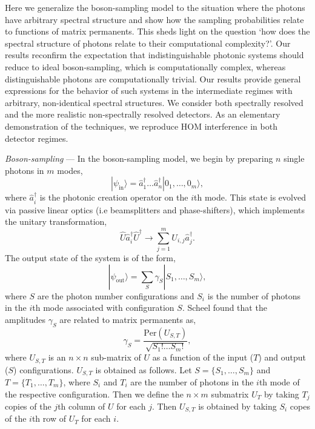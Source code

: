 \documentclass[aps,prl,twocolumn,amsmath,amssymb,nofootinbib,superscriptaddress]{revtex4}
\newcommand{\ket}[1]{|#1\rangle}
\begin{document}
Here we generalize the boson-sampling model to the situation where the photons have arbitrary spectral structure and show how the sampling probabilities relate to functions of matrix permanents. This sheds light on the question `how does the spectral structure of photons relate to their computational complexity?'. Our results reconfirm the expectation that indistinguishable photonic systems should reduce to ideal boson-sampling, which is computationally complex, whereas distinguishable photons are computationally trivial. Our results provide general expressions for the behavior of such systems in the intermediate regimes with arbitrary, non-identical spectral structures. We consider both spectrally resolved and the more realistic non-spectrally resolved detectors. As an elementary demonstration of the techniques, we reproduce HOM interference in both detector regimes.

%
%

\emph{Boson-sampling} --- In the boson-sampling model, we begin by preparing $n$ single photons in $m$ modes,
\begin{equation}
\ket{\psi_\mathrm{in}} = \hat{a}^\dag_1 \dots \hat{a}^\dag_n \ket{0_1,\dots,0_m},
\end{equation}
where \mbox{$\hat{a}^\dag_i$} is the photonic creation operator on the $i$th mode. This state is evolved via passive linear optics (i.e beamsplitters and phase-shifters), which implements the unitary transformation,
\begin{equation}
\hat{U}\hat{a}_i^\dag\hat{U}^\dag \to \sum_{j=1}^m U_{i,j} \hat{a}_j^\dag.
\end{equation}
The output state of the system is of the form,
\begin{equation}
\ket{\psi_\mathrm{out}} = \sum_S \gamma_S \ket{S_1,\dots,S_m},
\end{equation}
where $S$ are the photon number configurations and $S_i$ is the number of photons in the $i$th mode associated with configuration $S$. Scheel \cite{bib:Scheel04} found that the amplitudes $\gamma_S$ are related to matrix permanents as,
\begin{equation}
\gamma_S = \frac{\mathrm{Per}(U_{S,T})}{\sqrt{S_1!\dots S_m!}},
\end{equation}
where $U_{S,T}$ is an \mbox{$n\times n$} sub-matrix of $U$ as a function of the input ($T$) and output ($S$) configurations. $U_{S,T}$ is obtained as follows. Let \mbox{$S=\{S_1,\dots,S_m\}$} and \mbox{$T=\{T_1,\dots,T_m\}$}, where $S_i$ and $T_i$ are the number of photons in the $i$th mode of the respective configuration. Then we define the \mbox{$n\times m$} submatrix $U_T$ by taking $T_j$ copies of the $j$th column of $U$ for each $j$. Then $U_{S,T}$ is obtained by taking $S_i$ copes of the $i$th row of $U_T$ for each $i$.
\end{document}
